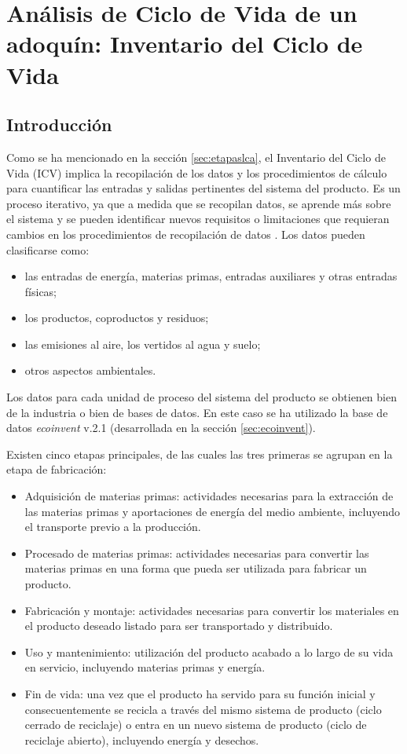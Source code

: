 \chapter{Análisis de Ciclo de Vida de un adoquín: Inventario del Ciclo de Vida}\label{cap:acv_inventario}

\section{Introducción}\label{sec:intro_icv}
Como se ha mencionado en la sección \ref{sec:etapaslca}, el Inventario del Ciclo de Vida (ICV) implica la recopilación de los datos y los procedimientos de cálculo para cuantificar las entradas y salidas pertinentes del sistema del producto. Es un proceso iterativo, ya que a medida que se recopilan datos, se aprende más sobre el sistema y se pueden identificar nuevos requisitos o limitaciones que requieran cambios en los procedimientos de recopilación de datos \cite{iso14040}. Los datos pueden clasificarse como:

\begin{itemize}
  \item las entradas de energía, materias primas, entradas auxiliares y otras entradas físicas;
  \item los productos, coproductos y residuos;
  \item las emisiones al aire, los vertidos al agua y suelo;
  \item otros aspectos ambientales.
\end{itemize}

Los datos para cada unidad de proceso del sistema del producto se obtienen bien de la industria o bien de bases de datos. En este caso se ha utilizado la base de datos \textit{ecoinvent} v.2.1 (desarrollada en la sección \ref{sec:ecoinvent}).

Existen cinco etapas principales, de las cuales las tres primeras se agrupan en la etapa de fabricación:
\begin{itemize}
  \item Adquisición de materias primas: actividades necesarias para la extracción de las materias primas y aportaciones de energía del medio ambiente, incluyendo el transporte previo a la producción.
  \item Procesado de materias primas: actividades necesarias para convertir las materias primas en una forma que pueda ser utilizada para fabricar un producto.
  \item Fabricación y montaje: actividades necesarias para convertir los materiales en el producto deseado listado para ser transportado y distribuido.
  \item Uso y mantenimiento: utilización del producto acabado a lo largo de su vida en servicio, incluyendo materias primas y energía.
  \item Fin de vida: una vez que el producto ha servido para su función inicial y consecuentemente se recicla a través del mismo sistema de producto (ciclo cerrado de reciclaje) o entra en un nuevo sistema de producto (ciclo de reciclaje abierto), incluyendo energía y desechos.
\end{itemize}

